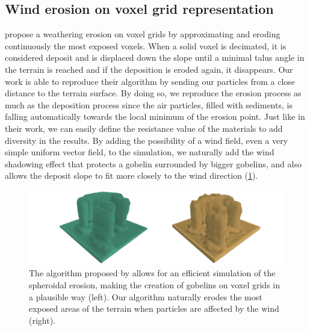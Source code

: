 \subsection{Wind erosion on voxel grid representation}
\citep{Jones2010} propose a weathering erosion on voxel grids by approximating and eroding continuously the most exposed voxels. When a solid voxel is decimated, it is considered deposit and is displaced down the slope until a minimal talus angle in the terrain is reached and if the deposition is eroded again, it disappears. Our work is able to reproduce their algorithm by sending our particles from a close distance to the terrain surface. By doing so, we reproduce the erosion process as much as the deposition process since the air particles, filled with sediments, is falling automatically towards the local minimum of the erosion point. Just like in their work, we can easily define the resistance value of the materials to add diversity in the results. By adding the possibility of a wind field, even a very simple uniform vector field, to the simulation, we naturally add the wind shadowing effect that protects a gobelin surrounded by bigger gobelins, and also allows the deposit slope to fit more closely to the wind direction (\cref{fig:erosion_screen-jones2010}).

\begin{figure}[ht]
    \centering
    \includegraphics[width = \linewidth]{otherPapersRepro/gobelins2.png}
    \caption{The algorithm proposed by \cite{Jones2010} allows for an efficient simulation of the spheroidal erosion, making the creation of gobelins on voxel grids in a plausible way (left). Our algorithm naturally erodes the most exposed areas of the terrain when particles are affected by the wind (right).}
    \label{fig:erosion_screen-jones2010}
\end{figure}

